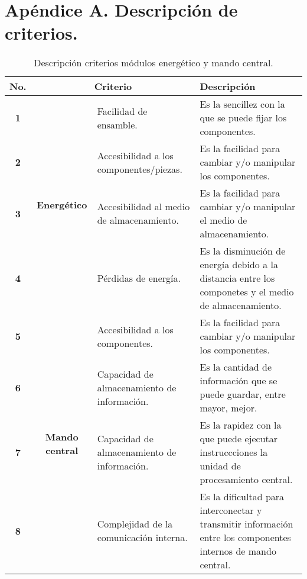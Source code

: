\chapter{Apéndice A. Descripción de criterios.}
\begin{table}[H]
	\centering
	\footnotesize
	\caption{Descripción criterios módulos energético y mando central.}
	\begin{tabular}{|c|c|p{10em}|p{23em}|}
		\hline
		\multicolumn{1}{|p{1.715em}|}{\textbf{\footnotesize No.}} & \multicolumn{2}{p{9em}|}{\textbf{ Criterio}} & \textbf{ Descripción} \\
		\hline
		\hline
		\textbf{1} & \multicolumn{1}{c|}{\multirow{4}[26]{*}{\begin{sideways}\textbf{ Energético}\end{sideways}}} &  Facilidad de ensamble. &  Es la sencillez con la que se puede fijar los componentes. \\
		\cline{1-1}\cline{3-4}    \textbf{2} &       &  Accesibilidad a los componentes/piezas. &  Es la facilidad para cambiar y/o manipular los componentes. \\
		\cline{1-1}\cline{3-4}    \textbf{3} &       &  Accesibilidad al medio de almacenamiento. &  Es la facilidad para cambiar y/o manipular el medio de almacenamiento. \\
		\cline{1-1}\cline{3-4}    \textbf{4} &       &  Pérdidas de energía. &  Es la disminución de energía debido a la distancia entre los componetes y el medio de almacenamiento. \\
		\hline
		\textbf{ 5} & \multicolumn{1}{c|}{\multirow{9}[20]{*}{\begin{sideways}\textbf{ Mando central}\end{sideways}}} &  Accesibilidad a los componentes. &  Es la facilidad para cambiar y/o manipular los componentes. \\
		\cline{1-1}\cline{3-4}    \textbf{ 6} &       &  Capacidad de almacenamiento de información. &  Es la cantidad de información que se puede guardar, entre mayor, mejor. \\
		\cline{1-1}\cline{3-4}    \textbf{ 7} &       &  Capacidad de almacenamiento de información. &  Es la rapidez con la que puede ejecutar instruccciones la unidad de procesamiento central. \\
		\cline{1-1}\cline{3-4}    \textbf{ 8} &       &  Complejidad de la comunicación interna. &  Es la dificultad para interconectar y transmitir información entre los componentes internos de mando central. \\

\end{tabular}
\end{table}
